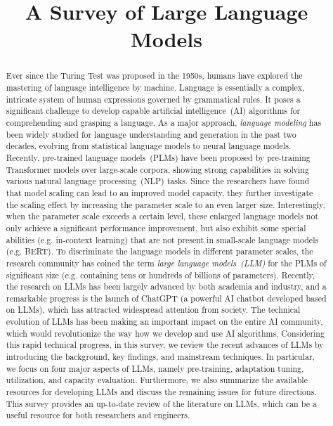 \title{A Survey of Large Language Models}

\begin{abstract}
\justifying Ever since the Turing Test was proposed in the 1950s,  humans have explored the mastering of  language intelligence by machine. Language is essentially a complex, intricate system of human expressions governed by grammatical rules. It poses  a significant challenge to develop capable artificial intelligence~(AI) algorithms  for comprehending and grasping a language. As a major approach, 
 \emph{language modeling} has been widely studied  for language understanding and generation in the past two decades, evolving from statistical language models to neural language models. Recently, pre-trained language models~(PLMs) have been proposed by pre-training Transformer models over large-scale corpora, showing strong capabilities in solving various natural language processing~(NLP) tasks. Since the researchers have found that model scaling can lead to an improved model capacity, they further investigate the scaling effect by increasing the parameter scale to an even larger size. Interestingly, when the parameter scale exceeds a certain level, these enlarged language models not only achieve a significant performance improvement, but also exhibit some special abilities (e.g. in-context learning) that are not present in small-scale  language models (e.g. BERT). To discriminate the language models in different parameter scales, the research community has coined the term \emph{large language models~(LLM)} for the PLMs of significant  size  {(e.g. containing tens or hundreds of billions of parameters)}. Recently, the research on LLMs has been largely advanced by both academia and industry, and a remarkable progress is the launch of ChatGPT (a powerful AI chatbot developed based on LLMs), which has attracted   widespread attention from society. The technical evolution of LLMs has been making an important impact on the entire AI community, which would  revolutionize the way how we develop and use AI algorithms. Considering this rapid technical progress, in this survey, we review the recent advances of LLMs by introducing the background, key findings, and mainstream techniques. In particular, we focus on four major aspects of LLMs, namely pre-training, adaptation tuning, utilization, and capacity evaluation. Furthermore, we also summarize the available resources for developing LLMs and discuss the remaining issues for future directions. This survey provides an up-to-date review of the literature on LLMs, which can be a useful resource for both researchers and engineers.
\end{abstract}

